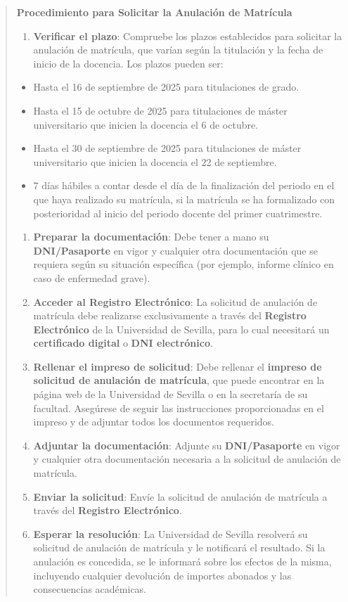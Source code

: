 \documentclass[12pt,a4paper,oneside]{report}
\begin{document}
\begin{itemize}
\begin{itemize}
\begin{quote}
\noindent\textbf{Procedimiento para Solicitar la Anulación de Matrícula}\\
\begin{enumerate}
  \item \textbf{Verificar el plazo}: Compruebe los plazos establecidos para solicitar la anulación de matrícula, que varían según la titulación y la fecha de inicio de la docencia. Los plazos pueden ser:
\end{enumerate}
\begin{itemize}
  \item Hasta el 16 de septiembre de 2025 para titulaciones de grado.
  \item Hasta el 15 de octubre de 2025 para titulaciones de máster universitario que inicien la docencia el 6 de octubre.
  \item Hasta el 30 de septiembre de 2025 para titulaciones de máster universitario que inicien la docencia el 22 de septiembre.
  \item 7 días hábiles a contar desde el día de la finalización del periodo en el que haya realizado su matrícula, si la matrícula se ha formalizado con posterioridad al inicio del periodo docente del primer cuatrimestre.
\end{itemize}
\begin{enumerate}
  \item \textbf{Preparar la documentación}: Debe tener a mano su \textbf{DNI/Pasaporte} en vigor y cualquier otra documentación que se requiera según su situación específica (por ejemplo, informe clínico en caso de enfermedad grave).
  \item \textbf{Acceder al Registro Electrónico}: La solicitud de anulación de matrícula debe realizarse exclusivamente a través del \textbf{Registro Electrónico} de la Universidad de Sevilla, para lo cual necesitará un \textbf{certificado digital} o \textbf{DNI electrónico}.
  \item \textbf{Rellenar el impreso de solicitud}: Debe rellenar el \textbf{impreso de solicitud de anulación de matrícula}, que puede encontrar en la página web de la Universidad de Sevilla o en la secretaría de su facultad. Asegúrese de seguir las instrucciones proporcionadas en el impreso y de adjuntar todos los documentos requeridos.
  \item \textbf{Adjuntar la documentación}: Adjunte su \textbf{DNI/Pasaporte} en vigor y cualquier otra documentación necesaria a la solicitud de anulación de matrícula.
  \item \textbf{Enviar la solicitud}: Envíe la solicitud de anulación de matrícula a través del \textbf{Registro Electrónico}.
  \item \textbf{Esperar la resolución}: La Universidad de Sevilla resolverá su solicitud de anulación de matrícula y le notificará el resultado. Si la anulación es concedida, se le informará sobre los efectos de la misma, incluyendo cualquier devolución de importes abonados y las consecuencias académicas.
\end{enumerate}


\end{quote}
\end{itemize}
\end{itemize}
\end{document}
